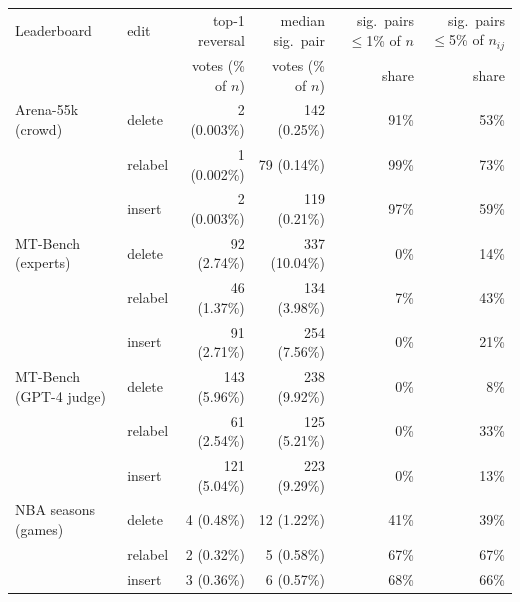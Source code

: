 \begin{tabular}{llrrrr}\toprule
Leaderboard & edit & top-1 reversal & median sig.\ pair & sig.\ pairs $\le$1\% of $n$ & sig.\ pairs $\le$5\% of $n_{ij}$ \\
 & & votes (\% of $n$) & votes (\% of $n$) & share & share \\\midrule
Arena-55k (crowd) & delete & 2 (0.003\%) & 142 (0.25\%) & 91\% & 53\% \\
 & relabel & 1 (0.002\%) & 79 (0.14\%) & 99\% & 73\% \\
 & insert & 2 (0.003\%) & 119 (0.21\%) & 97\% & 59\% \\
\addlinespace
MT-Bench (experts) & delete & 92 (2.74\%) & 337 (10.04\%) & 0\% & 14\% \\
 & relabel & 46 (1.37\%) & 134 (3.98\%) & 7\% & 43\% \\
 & insert & 91 (2.71\%) & 254 (7.56\%) & 0\% & 21\% \\
\addlinespace
MT-Bench (GPT-4 judge) & delete & 143 (5.96\%) & 238 (9.92\%) & 0\% & 8\% \\
 & relabel & 61 (2.54\%) & 125 (5.21\%) & 0\% & 33\% \\
 & insert & 121 (5.04\%) & 223 (9.29\%) & 0\% & 13\% \\
\addlinespace
NBA seasons (games) & delete & 4 (0.48\%) & 12 (1.22\%) & 41\% & 39\% \\
 & relabel & 2 (0.32\%) & 5 (0.58\%) & 67\% & 67\% \\
 & insert & 3 (0.36\%) & 6 (0.57\%) & 68\% & 66\% \\
\bottomrule\end{tabular}
